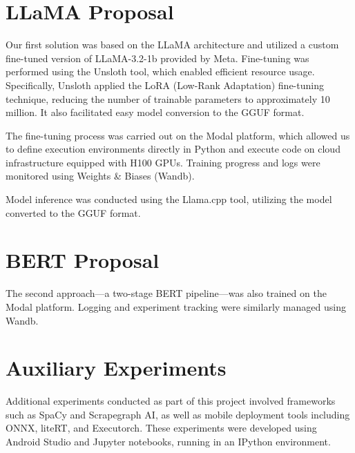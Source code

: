 \documentclass[licencjacka,en]{pracamgr}
\begin{document}
\section{LLaMA Proposal}

Our first solution was based on the LLaMA architecture and utilized a custom fine-tuned version of LLaMA-3.2-1b provided by Meta\cite{meta-llama}. Fine-tuning was performed using the Unsloth\cite{unsloth} tool, which enabled efficient resource usage. Specifically, Unsloth applied the LoRA (Low-Rank Adaptation) fine-tuning technique\cite{hu2021loralowrankadaptationlarge}, reducing the number of trainable parameters to approximately 10 million. It also facilitated easy model conversion to the GGUF format.

The fine-tuning process was carried out on the Modal platform\cite{modal}, which allowed us to define execution environments directly in Python and execute code on cloud infrastructure equipped with H100 GPUs. Training progress and logs were monitored using Weights \& Biases (Wandb)\cite{wandb}.

Model inference was conducted using the Llama.cpp\cite{llama-cpp} tool, utilizing the model converted to the GGUF format.

\section{BERT Proposal}

The second approach—a two-stage BERT pipeline—was also trained on the Modal platform. Logging and experiment tracking were similarly managed using Wandb.

\section{Auxiliary Experiments}

Additional experiments conducted as part of this project involved frameworks such as SpaCy\cite{spacy}\cite{spacy-exp} and Scrapegraph AI\cite{scapegraph_repo}\cite{scrapegraph-exp}, as well as mobile deployment tools including ONNX\cite{onnx}\cite{onnx-exp}, liteRT\cite{lite-rt}\cite{lite-rt-exp}, and Executorch\cite{executorch}\cite{executorch-exp}. These experiments were developed using Android Studio\cite{android-studio}\cite{service_demo_app_repo} and Jupyter notebooks\cite{jupyter}, running in an IPython\cite{ipython} environment.


\end{document}
